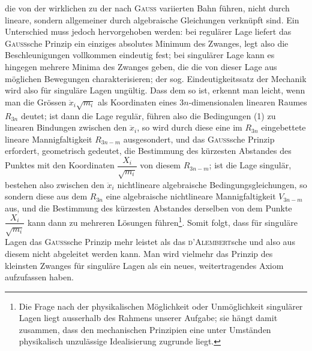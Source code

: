 die von der wirklichen zu der nach \textsc{Gauss} variierten Bahn
führen, nicht durch lineare, sondern allgemeiner durch algebraische Gleichungen
verknüpft sind. Ein Unterschied muss jedoch hervorgehoben werden: bei regulärer
Lage liefert das \textsc{Gauss}sche Prinzip ein einziges absolutes Minimum des Zwanges,
legt also die Beschleunigungen vollkommen eindeutig fest; bei singulärer Lage
kann es hingegen mehrere Minima des Zwanges geben, die die von dieser
Lage aus möglichen Bewegungen charakterisieren; der sog. Eindeutigkeitssatz
der Mechanik wird also für singuläre Lagen ungültig. Dass dem so ist, erkennt
man leicht, wenn man die Grössen $\ddot x_i\sqrt{m_i}$ als Koordinaten eines $3n$-dimensionalen
linearen Raumes $R_{3n}$ deutet; ist dann die Lage regulär, führen also die Bedingungen
(1) zu linearen Bindungen zwischen den $\ddot x_i$, so wird durch diese
eine im $R_{3n}$ eingebettete lineare Mannigfaltigkeit $R_{3n-m}$ ausgesondert, und
das \textsc{Gauss}sche Prinzip erfordert, geometrisch gedeutet, die Bestimmung des
kürzesten Abstandes des Punktes mit den Koordinaten $\dfrac{X_i}{\sqrt{m_i}}$ von diesem $R_{3n-m}$;
ist die Lage singulär, bestehen also zwischen den $\ddot x_i$ nichtlineare algebraische
Bedingungsgleichungen, so sondern diese aus dem $R_{3n}$ eine algebraische nichtlineare
Mannigfaltigkeit $V_{3n-m}$ aus, und die Bestimmung des kürzesten Abstandes
derselben von dem Punkte $\dfrac{X_i}{\sqrt{m_i}}$ kann dann zu mehreren Lösungen führen\footnote{Die Frage nach der physikalischen Möglichkeit oder Unmöglichkeit singulärer Lagen liegt ausserhalb
des Rahmens unserer Aufgabe; sie hängt damit zusammen, dass den mechanischen Prinzipien eine
unter Umständen physikalisch unzulässige Idealisierung zugrunde liegt.}.
\clearpage{}
\noindent Somit folgt, dass für singuläre Lagen das \textsc{Gauss}sche Prinzip mehr leistet als
das \textsc{d’Alembert}sche und also aus diesem nicht abgeleitet werden kann. Man
wird vielmehr das Prinzip des kleinsten Zwanges für singuläre Lagen als ein
neues, weitertragendes Axiom aufzufassen haben.
\clearpage\endgroup
